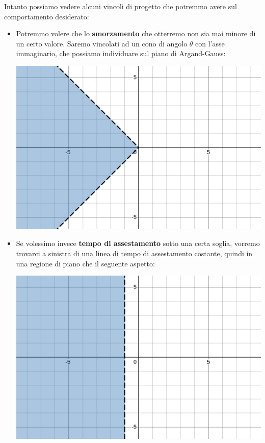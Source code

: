 \documentclass[a4paper,11pt]{article}
\begin{document}
Intanto possiamo vedere alcuni vincoli di progetto che potremmo avere sul comportamento desiderato:
\begin{itemize}
	\item 
		Potremmo volere che lo \textbf{smorzamento} che otterremo non sia mai minore di un certo valore. Saremo vincolati ad un cono di angolo $\theta$ con l'asse immaginario, che possiamo individuare sul piano di Argand-Gauss:
		\begin{center}
			\includegraphics[scale=0.28]{../figures/fixed_damping_region.png}
		\end{center}

	\item
		Se volessimo invece \textbf{tempo di assestamento} sotto una certa soglia, vorremo trovarci a sinistra di una linea di tempo di assestamento costante, quindi in una regione di piano che il seguente aspetto:
		\begin{center}
			\includegraphics[scale=0.28]{../figures/fixed_time_region.png}
		\end{center}


\end{itemize}
\end{document}
